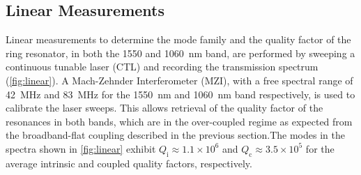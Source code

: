 \documentclass[reprint,superscriptaddress, amsmath,amssymb,pra, aps,floatfix,longbibliography]{revtex4-1}
\begin{document}
\subsection{Linear Measurements}

Linear measurements to determine the mode family and the quality factor of the ring resonator, in both the 1550 and 1060~nm band, are performed by sweeping a continuous tunable laser (CTL) and recording the transmission spectrum (\cref{fig:linear}). A Mach-Zehnder Interferometer (MZI), with a free spectral range of 42~MHz and 83~MHz for the 1550~nm and 1060~nm band respectively, is used to calibrate the laser sweeps. This allows retrieval of the quality factor of the resonances in both bands, which are in the over-coupled regime as expected from the broadband-flat coupling described in the previous section.The modes in the spectra shown in \cref{fig:linear} exhibit $Q_\mathrm{i}\approx1.1\times10^6$ and $Q_\mathrm{c}\approx 3.5\times10^5$ for the average intrinsic and coupled quality factors, respectively.
\end{document}
